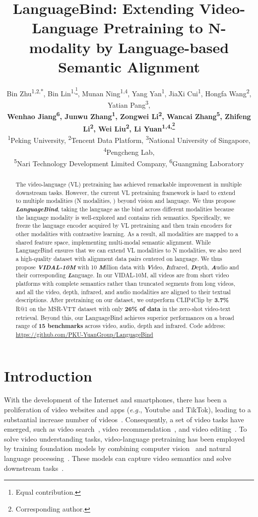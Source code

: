 \documentclass{article} \usepackage{iclr2024_conference,times}
\title{LanguageBind: Extending Video-Language Pretraining to N-modality by Language-based Semantic Alignment}
\author{Bin Zhu\textsuperscript{1,2,*}, Bin Lin\textsuperscript{1,\thanks{Equal contribution.}}, Munan Ning\textsuperscript{1,4}, Yang Yan\textsuperscript{1}, JiaXi Cui\textsuperscript{1}, Hongfa Wang\textsuperscript{2}, Yatian Pang\textsuperscript{3}, \\ \textbf{Wenhao Jiang\textsuperscript{6}, Junwu Zhang\textsuperscript{1}, Zongwei Li\textsuperscript{2}, Wancai Zhang\textsuperscript{5}, Zhifeng Li\textsuperscript{2}, Wei Liu\textsuperscript{2}, Li Yuan\textsuperscript{1,4,\thanks{Corresponding author.}} }  \\
\textsuperscript{1}Peking University,
\textsuperscript{2}Tencent Data Platform,
\textsuperscript{3}National  University of Singapore, 
\textsuperscript{4}Pengcheng Lab,  \\ \textsuperscript{5}Nari Technology Development Limited Company,
\textsuperscript{6}Guangming Laboratory \\
}
\begin{document}
\maketitle

\begin{abstract}



The video-language (VL) pretraining has achieved remarkable improvement in multiple downstream tasks.
However, the current VL pretraining framework is hard to extend to multiple modalities (N modalities, ) beyond vision and language. 
We thus propose \textbf{\textit{LanguageBind}}, taking the language as the bind across different modalities because the language modality is well-explored and contains rich semantics.
Specifically, we freeze the language encoder acquired by VL pretraining and then train encoders for other modalities with contrastive learning.
As a result, all modalities are mapped to a shared feature space, implementing multi-modal semantic alignment.
While LanguageBind ensures that we can extend VL modalities to N modalities, we also need a high-quality dataset with alignment data pairs centered on language. We thus propose \textbf{\textit{VIDAL-10M}} with 10 \textbf{\textit{M}}illion data with \textbf{\textit{V}}ideo, \textbf{\textit{I}}nfrared, \textbf{\textit{D}}epth, \textbf{\textit{A}}udio and their corresponding \textbf{\textit{L}}anguage. In our VIDAL-10M, all videos are from short video platforms with complete semantics rather than truncated segments from long videos, and all the video, depth, infrared, and audio modalities are aligned to their textual descriptions.
After pretraining on our dataset, we outperform CLIP4Clip by \textbf{3.7\%} R@1 on the MSR-VTT dataset with only \textbf{26\% of data} in the zero-shot video-text retrieval. Beyond this, our LanguageBind achieves superior performances on a broad range of \textbf{15 benchmarks} across video, audio, depth and infrared. Code address: \url{https://github.com/PKU-YuanGroup/LanguageBind}
\end{abstract}

\section{Introduction}

With the development of the Internet and smartphones, there has been a proliferation of video websites and apps (\textit{e.g.}, Youtube and TikTok), leading to a substantial increase number of videos~\citep{xue2022advancing}. Consequently, a set of video tasks have emerged, such as video search~\citep{smith1997image}, video recommendation~\citep{deldjoo2016content}, and video editing~\citep{casares2002simplifying, bonneel2014interactive}. To solve video understanding tasks, video-language pretraining has been employed by training foundation models by combining computer vision~\citep{he2016deep, dosovitskiy2020image} and natural language processing~\citep{vaswani2017attention}. These models can capture video semantics and solve downstream tasks~\citep{karpathy2014large, mithun2018learning}.
\end{document}
